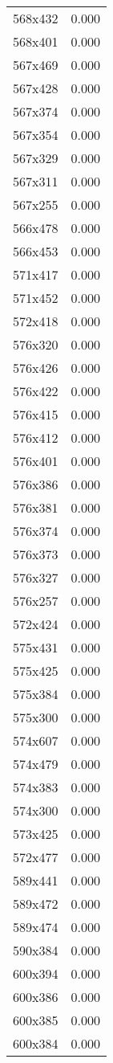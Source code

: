 \begin{table}
\begin{tabular}{lr}
568x432 & 0.000 \\
568x401 & 0.000 \\
567x469 & 0.000 \\
567x428 & 0.000 \\
567x374 & 0.000 \\
567x354 & 0.000 \\
567x329 & 0.000 \\
567x311 & 0.000 \\
567x255 & 0.000 \\
566x478 & 0.000 \\
566x453 & 0.000 \\
571x417 & 0.000 \\
571x452 & 0.000 \\
572x418 & 0.000 \\
576x320 & 0.000 \\
576x426 & 0.000 \\
576x422 & 0.000 \\
576x415 & 0.000 \\
576x412 & 0.000 \\
576x401 & 0.000 \\
576x386 & 0.000 \\
576x381 & 0.000 \\
576x374 & 0.000 \\
576x373 & 0.000 \\
576x327 & 0.000 \\
576x257 & 0.000 \\
572x424 & 0.000 \\
575x431 & 0.000 \\
575x425 & 0.000 \\
575x384 & 0.000 \\
575x300 & 0.000 \\
574x607 & 0.000 \\
574x479 & 0.000 \\
574x383 & 0.000 \\
574x300 & 0.000 \\
573x425 & 0.000 \\
572x477 & 0.000 \\
589x441 & 0.000 \\
589x472 & 0.000 \\
589x474 & 0.000 \\
590x384 & 0.000 \\
600x394 & 0.000 \\
600x386 & 0.000 \\
600x385 & 0.000 \\
600x384 & 0.000 \\

\end{tabular}
\end{table}
